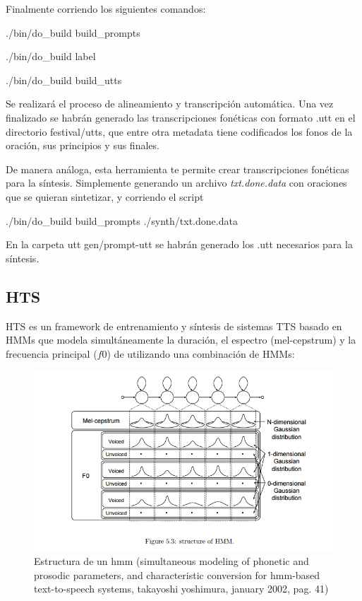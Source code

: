 Finalmente corriendo los siguientes comandos:

\begin{tcolorbox}
./bin/do\_build build\_prompts

./bin/do\_build label

./bin/do\_build build\_utts
\end{tcolorbox}

Se realizará el proceso de alineamiento y transcripción automática. Una vez finalizado se habrán generado las transcripciones fonéticas con formato .utt en el directorio festival/utts, que entre otra metadata tiene codificados los fonos de la oración, sus principios y sus finales.

De manera análoga, esta herramienta te permite crear transcripciones fonéticas para la síntesis. Simplemente generando un archivo \textit{txt.done.data} con oraciones que se quieran sintetizar, y corriendo el script

\begin{tcolorbox}
./bin/do\_build build\_prompts ./synth/txt.done.data
\end{tcolorbox}

En la carpeta utt gen/prompt-utt se habrán generado los .utt necesarios para la síntesis.


\subsection{HTS}


HTS es un framework de entrenamiento y síntesis de sistemas TTS basado en HMMs que modela simultáneamente la duración, el espectro (mel-cepstrum) y la frecuencia principal ($f0$) de utilizando una combinación de HMMs:

\begin{figure}
\includegraphics[scale=0.5]{imagenes/hmm.png}
\caption{Estructura de un hmm (simultaneous modeling of phonetic and prosodic parameters, and characteristic conversion for hmm-based text-to-speech systems, takayoshi yoshimura, january 2002, pag. 41)}
\label{hmmStructure}
\centering
\end{figure}

